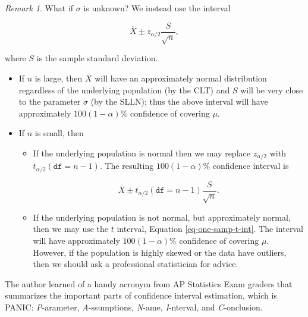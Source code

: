 \documentclass[]{book}
\providecommand{\tightlist}{%
  \setlength{\itemsep}{0pt}\setlength{\parskip}{0pt}}
\numberwithin{equation}{chapter}
\numberwithin{figure}{chapter}
\theoremstyle{plain}
\theoremstyle{definition}
\theoremstyle{remark}
\theoremstyle{definition}
\theoremstyle{definition}
\theoremstyle{remark}
\newtheorem*{remark}{Remark}
\begin{document}
\bigskip

\begin{remark}
What if \(\sigma\) is unknown? We instead use the interval

\begin{equation}
\overline{X}\pm z_{\alpha/2}\frac{S}{\sqrt{n}},
\end{equation}

where \(S\) is the sample standard deviation.

\begin{itemize}
\tightlist
\item
  If \(n\) is large, then \(\overline{X}\) will have an approximately
  normal distribution regardless of the underlying population (by the
  CLT) and \(S\) will be very close to the parameter \(\sigma\) (by the
  SLLN); thus the above interval will have approximately
  \(100(1-\alpha)\%\) confidence of covering \(\mu\).
\item
  If \(n\) is small, then

  \begin{itemize}
  \tightlist
  \item
    If the underlying population is normal then we may replace
    \(z_{\alpha/2}\) with \(t_{\alpha/2}(\mathtt{df}=n-1)\). The
    resulting \(100(1-\alpha)\%\) confidence interval is

    \begin{equation}
      \label{eq-one-samp-t-int}
      \overline{X}\pm t_{\alpha/2}(\mathtt{df}=n-1)\frac{S}{\sqrt{n}}.
      \end{equation}
  \item
    If the underlying population is not normal, but approximately
    normal, then we may use the \(t\) interval, Equation
    \eqref{eq-one-samp-t-int}. The interval will have approximately
    \(100(1-\alpha)\%\) confidence of covering \(\mu\). However, if the
    population is highly skewed or the data have outliers, then we
    should ask a professional statistician for advice.
  \end{itemize}
\end{itemize}
\end{remark}

The author learned of a handy acronym from AP Statistics Exam graders
that summarizes the important parts of confidence interval estimation,
which is PANIC: \emph{P}-arameter, \emph{A}-ssumptions, \emph{N}-ame,
\emph{I}-nterval, and \emph{C}-onclusion.
\end{document}
